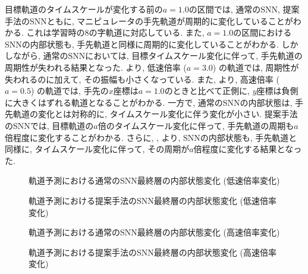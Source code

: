 目標軌道のタイムスケールが変化する前の$a=1.0$の区間では, 通常のSNN, 提案手法のSNNともに, マニピュレータの手先軌道が周期的に変化していることがわかる.
これは学習時の8の字軌道に対応している.
また, $a=1.0$の区間におけるSNNの内部状態も, 手先軌道と同様に周期的に変化していることがわかる.
しかしながら, 通常のSNNにおいては, 目標タイムスケール変化に伴って, 手先軌道の周期性が失われる結果となった.
より, 低速倍率 ($a=3.0$) の軌道では, 周期性が失われるのに加えて, その振幅も小さくなっている.
また, より, 高速倍率 ($a=0.5$) の軌道では, 手先の$x$座標は$a=1.0$のときと比べて正側に, $y$座標は負側に大きくはずれる軌道となることがわかる.
一方で, 通常のSNNの内部状態は, 手先軌道の変化とは対称的に, タイムスケール変化に伴う変化が小さい.
提案手法のSNNでは, 目標軌道の$a$倍のタイムスケール変化に伴って, 手先軌道の周期も$a$倍程度に変化することがわかる.
さらに, , より, SNNの内部状態も, 手先軌道と同様に, タイムスケール変化に伴って, その周期が$a$倍程度に変化する結果となった.
\begin{figure}[htbp] %
    \centering
    
    \caption{
        軌道予測における通常のSNN最終層の内部状態変化 (低速倍率変化)
        }
    \label{fig:discussion3:snn:a3}
\end{figure}

\begin{figure}[htbp] %
    \centering
    
    \caption{
        軌道予測における提案手法のSNN最終層の内部状態変化 (低速倍率変化)
        }
    \label{fig:discussion3:dyna:a3}
\end{figure}


\begin{figure}[htbp] %
    \centering
    
    \caption{
        軌道予測における通常のSNN最終層の内部状態変化 (高速倍率変化)
        }
    \label{fig:discussion3:snn:a05}
\end{figure}

\begin{figure}[htbp] %
    \centering
    
    \caption{
        軌道予測における提案手法のSNN最終層の内部状態変化 (高速倍率変化)
        }
    \label{fig:discussion3:dyna:a05}
\end{figure}
